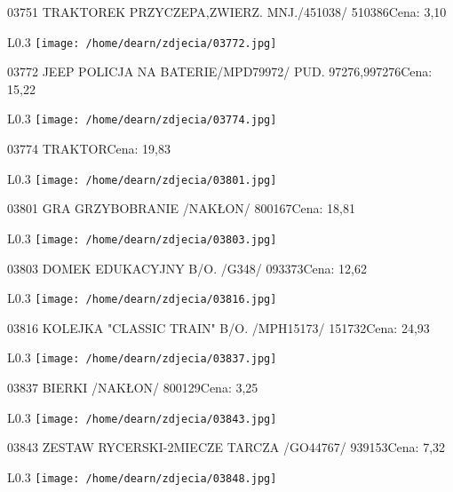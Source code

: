 03751 TRAKTOREK PRZYCZEPA,ZWIERZ. MNJ./451038/        510386Cena: 3,10\newline
\begin{wrapfigure}{L}{0.3\textwidth}
\texttt{[image: /home/dearn/zdjecia/03772.jpg]}
\end{wrapfigure}
03772 JEEP POLICJA NA BATERIE/MPD79972/ PUD.    97276,997276Cena: 15,22\newline
\begin{wrapfigure}{L}{0.3\textwidth}
\texttt{[image: /home/dearn/zdjecia/03774.jpg]}
\end{wrapfigure}
03774 TRAKTORCena: 19,83\newline
\begin{wrapfigure}{L}{0.3\textwidth}
\texttt{[image: /home/dearn/zdjecia/03801.jpg]}
\end{wrapfigure}
03801 GRA GRZYBOBRANIE /NAKŁON/                       800167Cena: 18,81\newline
\begin{wrapfigure}{L}{0.3\textwidth}
\texttt{[image: /home/dearn/zdjecia/03803.jpg]}
\end{wrapfigure}
03803 DOMEK EDUKACYJNY B/O. /G348/                    093373Cena: 12,62\newline
\begin{wrapfigure}{L}{0.3\textwidth}
\texttt{[image: /home/dearn/zdjecia/03816.jpg]}
\end{wrapfigure}
03816 KOLEJKA "CLASSIC TRAIN" B/O. /MPH15173/         151732Cena: 24,93\newline
\begin{wrapfigure}{L}{0.3\textwidth}
\texttt{[image: /home/dearn/zdjecia/03837.jpg]}
\end{wrapfigure}
03837 BIERKI /NAKŁON/                                 800129Cena: 3,25\newline
\begin{wrapfigure}{L}{0.3\textwidth}
\texttt{[image: /home/dearn/zdjecia/03843.jpg]}
\end{wrapfigure}
03843 ZESTAW RYCERSKI-2MIECZE TARCZA /GO44767/        939153Cena: 7,32\newline
\begin{wrapfigure}{L}{0.3\textwidth}
\texttt{[image: /home/dearn/zdjecia/03848.jpg]}
\end{wrapfigure}
